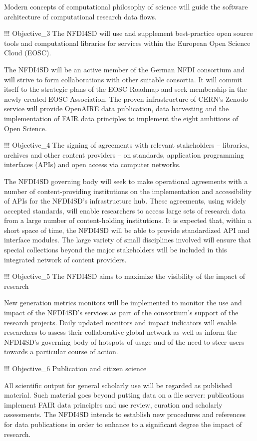 Modern concepts of computational philosophy of science will guide the
software architecture of computational research data flows.

!!! Objective\_3 The NFDI4SD will use and supplement best-practice open
source tools and computational libraries for services within the
European Open Science Cloud (EOSC).

The NFDI4SD will be an active member of the German NFDI consortium and
will strive to form collaborations with other suitable consortia. It
will commit itself to the strategic plans of the EOSC Roadmap and seek
membership in the newly created EOSC Association. The proven
infrastructure of CERN's Zenodo service will provide OpenAIRE data
publication, data harvesting and the implementation of FAIR data
principles to implement the eight ambitions of Open Science.

!!! Objective\_4 The signing of agreements with relevant stakeholders --
libraries, archives and other content providers -- on standards,
application programming interfaces (APIs) and open access via computer
networks.

The NFDI4SD governing body will seek to make operational agreements with
a number of content-providing institutions on the implementation and
accessibility of APIs for the NFDI4SD's infrastructure hub. These
agreements, using widely accepted standards, will enable researchers to
access large sets of research data from a large number of
content-holding institutions. It is expected that, within a short space
of time, the NFDI4SD will be able to provide standardized API and
interface modules. The large variety of small disciplines involved will
ensure that special collections beyond the major stakeholders will be
included in this integrated network of content providers.

!!! Objective\_5 The NFDI4SD aims to maximize the visibility of the
impact of research

New generation metrics monitors will be implemented to monitor the use
and impact of the NFDI4SD's services as part of the consortium's support
of the research projects. Daily updated monitors and impact indicators
will enable researchers to assess their collaborative global network as
well as inform the NFDI4SD's governing body of hotspots of usage and of
the need to steer users towards a particular course of action.

!!! Objective\_6 Publication and citizen science

All scientific output for general scholarly use will be regarded as
published material. Such material goes beyond putting data on a file
server: publications implement FAIR data principles and use review,
curation and scholarly assessments. The NFDI4SD intends to establish new
procedures and references for data publications in order to enhance to a
significant degree the impact of research.

